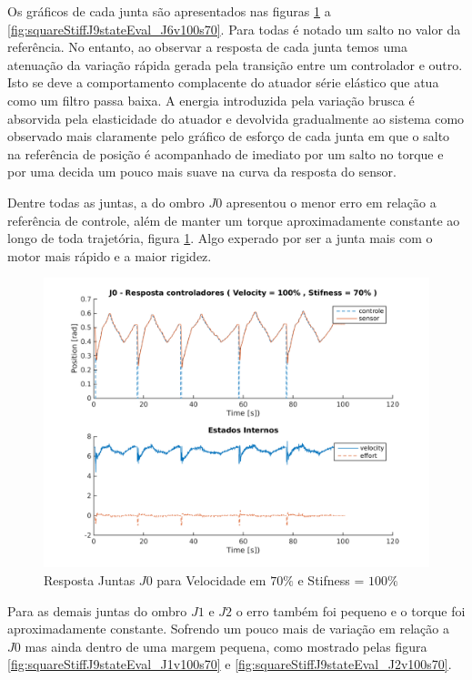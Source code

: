 Os gráficos de cada junta são apresentados nas figuras \ref{fig:squareStiffJ9stateEval_J0v100s70} a \ref{fig:squareStiffJ9stateEval_J6v100s70}. Para todas é notado um salto no valor da referência. No entanto, ao observar a resposta de cada junta temos uma atenuação da variação rápida gerada pela transição entre um controlador e outro. Isto se deve a comportamento complacente do atuador série elástico que atua como um filtro passa baixa. A energia introduzida pela variação brusca é absorvida pela elasticidade do atuador e devolvida gradualmente ao sistema como observado mais claramente pelo gráfico de esforço de cada junta em que o salto na referência de posição é acompanhado de imediato por um salto no torque e por uma decida um pouco mais suave na curva da resposta do sensor. 

Dentre todas as juntas, a do ombro $J0$ apresentou o menor erro em relação a referência de controle, além de manter um torque aproximadamente constante ao longo de toda trajetória, figura \ref{fig:squareStiffJ9stateEval_J0v100s70}. Algo experado por ser a junta mais com o motor mais rápido e a maior rigidez.

\vspace{1cm}

\begin{figure}[H]
    \centering
    \includegraphics[width=0.6\linewidth,trim={2cm 1cm 2cm 2cm}]{tex/figs/squareStiffJ9stateEval_J0v100s70.png}
    \caption{Resposta Juntas $J0$ para Velocidade em $70\%$ e Stifness = $100\%$ }
    \label{fig:squareStiffJ9stateEval_J0v100s70}
\end{figure}

Para as demais juntas do ombro $J1$ e $J2$ o erro também foi pequeno e o torque foi aproximadamente constante. Sofrendo um pouco mais de variação em relação a $J0$ mas ainda dentro de uma margem pequena, como mostrado pelas figura \ref{fig:squareStiffJ9stateEval_J1v100s70} e \ref{fig:squareStiffJ9stateEval_J2v100s70}.

